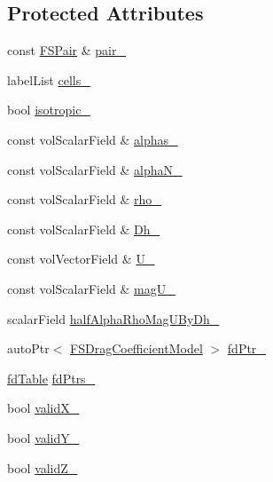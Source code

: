 \subsection*{Protected Attributes}
\begin{DoxyCompactItemize}
\item 
const \hyperlink{classFoam_1_1FSPair}{F\+S\+Pair} \& \hyperlink{classFoam_1_1FSDragFactor_a587e19a1b4f4b498d2604d20c093a73b}{pair\+\_\+}
\item 
label\+List \hyperlink{classFoam_1_1FSDragFactor_a668e23f1aa896d53b68f6182e48f32d9}{cells\+\_\+}
\item 
bool \hyperlink{classFoam_1_1FSDragFactor_a3c15d115e70032590a4b702bb52bbac1}{isotropic\+\_\+}
\item 
const vol\+Scalar\+Field \& \hyperlink{classFoam_1_1FSDragFactor_a409c831ae1f6df5fd5fa026c96048b1a}{alphas\+\_\+}
\item 
const vol\+Scalar\+Field \& \hyperlink{classFoam_1_1FSDragFactor_afd4cda4547d99466a3857a0778af6e29}{alpha\+N\+\_\+}
\item 
const vol\+Scalar\+Field \& \hyperlink{classFoam_1_1FSDragFactor_ab78356ab728aa016ae26aa9ac0137ec4}{rho\+\_\+}
\item 
const vol\+Scalar\+Field \& \hyperlink{classFoam_1_1FSDragFactor_a9f354183d629b4422e533a56df9634a4}{Dh\+\_\+}
\item 
const vol\+Vector\+Field \& \hyperlink{classFoam_1_1FSDragFactor_a6dc21987d43bf648b90e643918b02353}{U\+\_\+}
\item 
const vol\+Scalar\+Field \& \hyperlink{classFoam_1_1FSDragFactor_a5d86facdeda69751165ac573c860e485}{mag\+U\+\_\+}
\item 
scalar\+Field \hyperlink{classFoam_1_1FSDragFactor_a44668fd761d7749d130a8c6ccd4e8f6b}{half\+Alpha\+Rho\+Mag\+U\+By\+Dh\+\_\+}
\item 
auto\+Ptr$<$ \hyperlink{classFoam_1_1FSDragCoefficientModel}{F\+S\+Drag\+Coefficient\+Model} $>$ \hyperlink{classFoam_1_1FSDragFactor_ad58ffd69849069f90016981b041d7ab2}{fd\+Ptr\+\_\+}
\item 
\hyperlink{classFoam_1_1FSDragFactor_a7760b746b5c75541218a8e6bcf18af90}{fd\+Table} \hyperlink{classFoam_1_1FSDragFactor_aa70ab8b33719ff9cdab03dfaae24ece8}{fd\+Ptrs\+\_\+}
\item 
bool \hyperlink{classFoam_1_1FSDragFactor_aa315e4360176e0a73647496cd5a91790}{valid\+X\+\_\+}
\item 
bool \hyperlink{classFoam_1_1FSDragFactor_ae908ca79440b2a0b723a5bb2d0439529}{valid\+Y\+\_\+}
\item 
bool \hyperlink{classFoam_1_1FSDragFactor_a7b6a9411b294d4fb22a245d3d0f151f3}{valid\+Z\+\_\+}
\end{DoxyCompactItemize}


